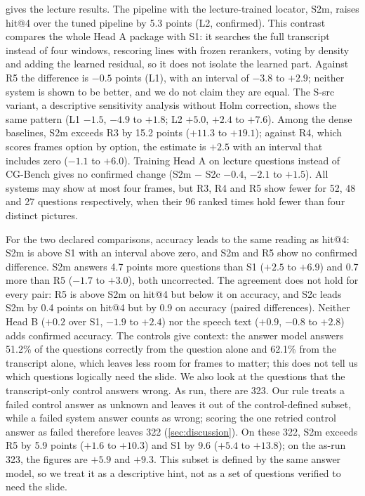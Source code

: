  gives the lecture results.
The pipeline with the lecture-trained locator, S2m, raises hit@4 over the tuned pipeline by 5.3 points (L2, confirmed).
This contrast compares the whole Head A package with S1: it searches the full transcript instead of four windows, rescoring lines with frozen rerankers, voting by density and adding the learned residual, so it does not isolate the learned part.
Against R5 the difference is $-0.5$ points (L1), with an interval of $-3.8$ to $+2.9$; neither system is shown to be better, and we do not claim they are equal.
The S-src variant, a descriptive sensitivity analysis without Holm correction, shows the same pattern (L1 $-1.5$, $-4.9$ to $+1.8$; L2 $+5.0$, $+2.4$ to $+7.6$).
Among the dense baselines, S2m exceeds R3 by 15.2 points ($+11.3$ to $+19.1$); against R4, which scores frames option by option, the estimate is $+2.5$ with an interval that includes zero ($-1.1$ to $+6.0$).
Training Head A on lecture questions instead of CG-Bench gives no confirmed change (S2m $-$ S2c $-0.4$, $-2.1$ to $+1.5$).
All systems may show at most four frames, but R3, R4 and R5 show fewer for 52, 48 and 27 questions respectively, when their 96 ranked times hold fewer than four distinct pictures.

For the two declared comparisons, accuracy leads to the same reading as hit@4: S2m is above S1 with an interval above zero, and S2m and R5 show no confirmed difference.
S2m answers 4.7 points more questions than S1 ($+2.5$ to $+6.9$) and 0.7 more than R5 ($-1.7$ to $+3.0$), both uncorrected.
The agreement does not hold for every pair: R5 is above S2m on hit@4 but below it on accuracy, and S2c leads S2m by 0.4 points on hit@4 but by 0.9 on accuracy (paired differences).
Neither Head B ($+0.2$ over S1, $-1.9$ to $+2.4$) nor the speech text ($+0.9$, $-0.8$ to $+2.8$) adds confirmed accuracy.
The controls give context: the answer model answers 51.2\% of the questions correctly from the question alone and 62.1\% from the transcript alone, which leaves less room for frames to matter; this does not tell us which questions logically need the slide.
We also look at the questions that the transcript-only control answers wrong.
As run, there are 323. Our rule treats a failed control answer as unknown and leaves it out of the control-defined subset, while a failed system answer counts as wrong; scoring the one retried control answer as failed therefore leaves 322 (\cref{sec:discussion}).
On these 322, S2m exceeds R5 by 5.9 points ($+1.6$ to $+10.3$) and S1 by 9.6 ($+5.4$ to $+13.8$); on the as-run 323, the figures are $+5.9$ and $+9.3$.
This subset is defined by the same answer model, so we treat it as a descriptive hint, not as a set of questions verified to need the slide.

